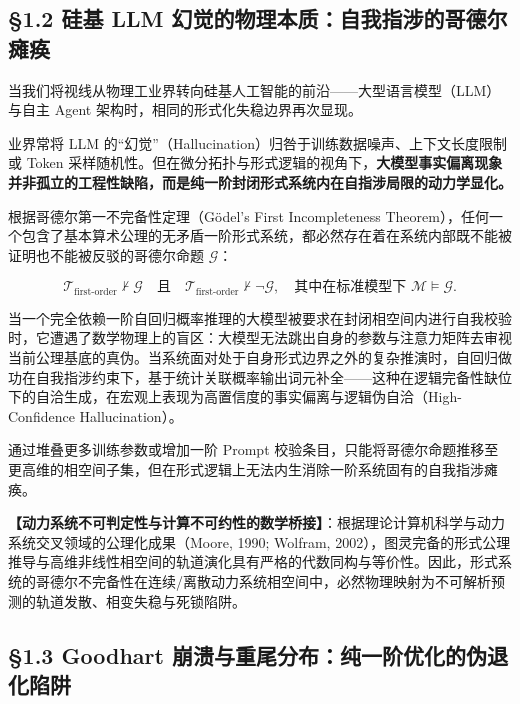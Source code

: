 \documentclass[11pt,a4paper,oneside]{ctexart}
\begin{document}
\subsection{§1.2 硅基 LLM 幻觉的物理本质：自我指涉的哥德尔瘫痪}

当我们将视线从物理工业界转向硅基人工智能的前沿------大型语言模型（LLM）与自主 Agent 架构时，相同的形式化失稳边界再次显现。


业界常将 LLM 的“幻觉”（Hallucination）归咎于训练数据噪声、上下文长度限制或 Token 采样随机性。但在微分拓扑与形式逻辑的视角下，\textbf{大模型事实偏离现象并非孤立的工程性缺陷，而是纯一阶封闭形式系统内在自指涉局限的动力学显化。}


根据哥德尔第一不完备性定理（Gödel's First Incompleteness Theorem），任何一个包含了基本算术公理的无矛盾一阶形式系统，都必然存在着在系统内部既不能被证明也不能被反驳的哥德尔命题 $\mathcal{G}$：


\begin{equation}
\mathcal{T}_{\text{first-order}} \nvdash \mathcal{G} \quad \text{且} \quad \mathcal{T}_{\text{first-order}} \nvdash \neg \mathcal{G}, \quad \text{其中在标准模型下 } \mathcal{M} \models \mathcal{G}.
\end{equation}

当一个完全依赖一阶自回归概率推理的大模型被要求在封闭相空间内进行自我校验时，它遭遇了数学物理上的盲区：大模型无法跳出自身的参数与注意力矩阵去审视当前公理基底的真伪。当系统面对处于自身形式边界之外的复杂推演时，自回归做功在自我指涉约束下，基于统计关联概率输出词元补全------这种在逻辑完备性缺位下的自洽生成，在宏观上表现为高置信度的事实偏离与逻辑伪自洽（High-Confidence Hallucination）。


通过堆叠更多训练参数或增加一阶 Prompt 校验条目，只能将哥德尔命题推移至更高维的相空间子集，但在形式逻辑上无法内生消除一阶系统固有的自我指涉瘫痪。


\begin{notebox}
\textbf{【动力系统不可判定性与计算不可约性的数学桥接】}：根据理论计算机科学与动力系统交叉领域的公理化成果（Moore, 1990; Wolfram, 2002），图灵完备的形式公理推导与高维非线性相空间的轨道演化具有严格的代数同构与等价性。因此，形式系统的哥德尔不完备性在连续/离散动力系统相空间中，必然物理映射为不可解析预测的轨道发散、相变失稳与死锁陷阱。
\end{notebox}

\subsection{§1.3 Goodhart 崩溃与重尾分布：纯一阶优化的伪退化陷阱}
\end{document}
